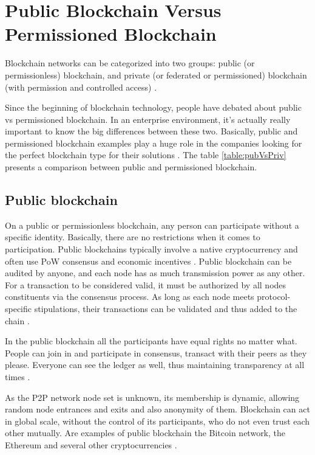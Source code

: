 \section{Public Blockchain Versus Permissioned Blockchain}\label{sec:versus}

Blockchain networks can be categorized into two groups: public (or permissionless) blockchain, and private (or federated or permissioned) blockchain (with permission and controlled access) \cite{greve2018blockchain}.

Since the beginning of blockchain technology, people have debated about public vs permissioned blockchain. In an enterprise environment, it’s actually really important to know the big differences between these two. Basically, public and permissioned blockchain examples play a huge role in the companies looking for the perfect blockchain type for their solutions \cite{101blockchains}. The table \ref{table:pubVsPriv} presents a comparison between public and permissioned blockchain.

\subsection{Public blockchain}\label{sec:blockchainPublica}
On a public or permissionless blockchain, any person can participate without a specific identity. Basically, there are no restrictions when it comes to participation. Public blockchains typically involve a native cryptocurrency and often use \acf{PoW} consensus and economic incentives \cite{androulaki2018hyperledger}. Public blockchain can be audited by anyone, and each node has as much transmission power as any other. For a transaction to be considered valid, it must be authorized by all nodes constituents via the consensus process. As long as each node meets protocol-specific stipulations, their transactions can be validated and thus added to the chain \cite{Comstor2018}.

In the public blockchain all the participants have equal rights no matter what. People can join in and participate in consensus, transact with their peers as they please. Everyone can see the ledger as well, thus maintaining transparency at all times \cite{101blockchains}.

As the P2P network node set is unknown, its membership is dynamic, allowing random node entrances and exits and also anonymity of them. Blockchain can act in global scale, without the control of its participants, who do not even trust each other mutually. Are examples of public blockchain the Bitcoin network, the Ethereum and several other cryptocurrencies \cite{bashir2018mastering, antonopoulos2017mastering}.

